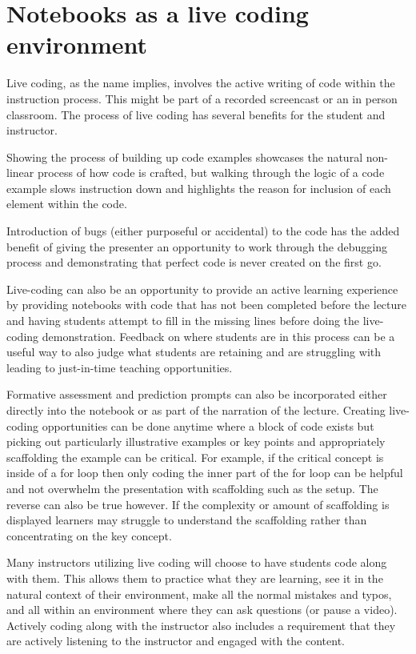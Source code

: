 \documentclass[]{book}
\begin{document}
\section{Notebooks as a live coding
environment}\label{notebooks-as-a-live-coding-environment}

Live coding, as the name implies, involves the active writing of code
within the instruction process. This might be part of a recorded
screencast or an in person classroom. The process of live coding has
several benefits for the student and instructor.

Showing the process of building up code examples showcases the natural
non-linear process of how code is crafted, but walking through the logic
of a code example slows instruction down and highlights the reason for
inclusion of each element within the code.

Introduction of bugs (either purposeful or accidental) to the code has
the added benefit of giving the presenter an opportunity to work through
the debugging process and demonstrating that perfect code is never
created on the first go.

Live-coding can also be an opportunity to provide an active learning
experience by providing notebooks with code that has not been completed
before the lecture and having students attempt to fill in the missing
lines before doing the live-coding demonstration. Feedback on where
students are in this process can be a useful way to also judge what
students are retaining and are struggling with leading to just-in-time
teaching opportunities.

Formative assessment and prediction prompts can also be incorporated
either directly into the notebook or as part of the narration of the
lecture. Creating live-coding opportunities can be done anytime where a
block of code exists but picking out particularly illustrative examples
or key points and appropriately scaffolding the example can be critical.
For example, if the critical concept is inside of a for loop then only
coding the inner part of the for loop can be helpful and not overwhelm
the presentation with scaffolding such as the setup. The reverse can
also be true however. If the complexity or amount of scaffolding is
displayed learners may struggle to understand the scaffolding rather
than concentrating on the key concept.

Many instructors utilizing live coding will choose to have students code
along with them. This allows them to practice what they are learning,
see it in the natural context of their environment, make all the normal
mistakes and typos, and all within an environment where they can ask
questions (or pause a video). Actively coding along with the instructor
also includes a requirement that they are actively listening to the
instructor and engaged with the content.
\end{document}

